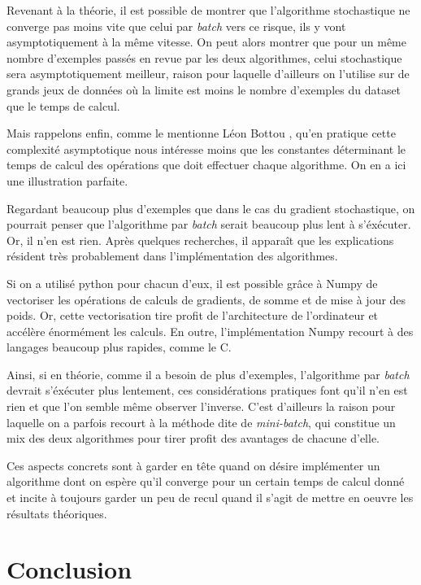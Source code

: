 \documentclass{article}
\begin{document}
Revenant à la théorie, il est possible de montrer que l'algorithme stochastique ne converge pas moins vite que celui par \emph{batch} vers ce risque, ils y vont asymptotiquement à la même vitesse. On peut alors montrer que pour un même nombre d'exemples passés en revue par les deux algorithmes, celui stochastique sera asymptotiquement meilleur, raison pour laquelle d'ailleurs on l'utilise sur de grands jeux de données où la limite est moins le nombre d'exemples du dataset que le temps de calcul. 
\bigskip

Mais rappelons enfin, comme le mentionne Léon Bottou \cite{bottou-mlss-2004}, qu'en pratique cette complexité asymptotique nous intéresse moins que les constantes déterminant le temps de calcul des opérations que doit effectuer chaque algorithme. On en a ici une illustration parfaite. 
\bigskip

Regardant beaucoup plus d'exemples que dans le cas du gradient stochastique, on pourrait penser que l'algorithme par \emph{batch} serait beaucoup plus lent à s'éxécuter. Or, il n'en est rien. Après quelques recherches, il apparaît que les explications résident très probablement dans l'implémentation des algorithmes. 

Si on a utilisé python pour chacun d'eux, il est possible grâce à Numpy de vectoriser les opérations de calculs de gradients, de somme et de mise à jour des poids. Or, cette vectorisation tire profit de l'architecture de l'ordinateur et accélère énormément les calculs. En outre, l'implémentation Numpy recourt à des langages beaucoup plus rapides, comme le C. 
\bigskip

Ainsi, si en théorie, comme il a besoin de plus d'exemples, l'algorithme par \emph{batch} devrait s'éxécuter plus lentement, ces considérations pratiques font qu'il n'en est rien et que l'on semble même observer l'inverse. C'est d'ailleurs la raison pour laquelle on a parfois recourt à la méthode dite de \emph{mini-batch}, qui constitue un mix des deux algorithmes pour tirer profit des avantages de chacune d'elle. 
\bigskip

Ces aspects concrets sont à garder en tête quand on désire implémenter un algorithme dont on espère qu'il converge pour un certain temps de calcul donné et incite à toujours garder un peu de recul quand il s'agit de mettre en oeuvre les résultats théoriques.



\section*{Conclusion}
\end{document}

